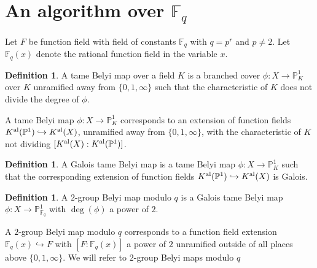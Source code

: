 \documentclass{dcthesis}
\newcommand{\PP}{\mathbb P}
\newcommand{\defi}[1]{\textsf{#1}}
\newcommand{\Kal}{{{K}^{\textup{al}}}}
\newcommand{\FF}{\mathbb{F}}
\numberwithin{equation}{section}
\theoremstyle{definition}
\newtheorem{definition}[equation]{Definition}
\theoremstyle{remark}
\begin{document}
{{  \section{An algorithm over $\FF_q$}{
    \label{sec:functionfieldalgorithm}
    Let $F$ be function field
    with field of constants
    $\FF_q$ with $q=p^r$ and $p\neq 2$.
    Let $\FF_q(x)$ denote the rational
    function field in the variable $x$.
    \begin{definition}
      \label{def:tamebelyimap}
      A \defi{tame Belyi map}
      over a field $K$
      is a branched cover
      $\phi\colon X\to\PP_K^1$
      over $K$ unramified away from
      $\{0,1,\infty\}$
      such that the characteristic of $K$
      does not divide the degree of $\phi$.
    \end{definition}
    A tame Belyi map $\phi\colon X\to\PP_K^1$
    corresponds to an extension of function fields
    $\Kal(\PP^1)\hookrightarrow \Kal(X)$,
    unramified away from $\{0,1,\infty\}$,
    with the characteristic of $K$ not dividing
    $[\Kal(X):\Kal(\PP^1)]$.
    \begin{definition}
      \label{def:galoistamebelyi}
      A \defi{Galois tame Belyi map}
      is a tame Belyi map $\phi\colon X\to\PP_K^1$
      such that the corresponding
      extension of function fields
      $\Kal(\PP^1)\hookrightarrow\Kal(X)$ is Galois.
    \end{definition}
    \begin{definition}
      \label{def:pgroupbelyimapmodq}
      A \defi{$2$-group Belyi map modulo $q$}
      is a Galois tame Belyi map
      $\phi\colon X\to\PP_{\FF_q}^1$
      with $\deg(\phi)$ a power of $2$.
    \end{definition}
    A $2$-group Belyi map modulo $q$ corresponds
    to a function field extension
    $\FF_q(x)\hookrightarrow F$ with
    $[F:\FF_q(x)]$ a power of $2$
    unramified outside of all places above
    $\{0,1,\infty\}$.
    We will refer to $2$-group Belyi maps modulo $q$
}}}
\end{document}
